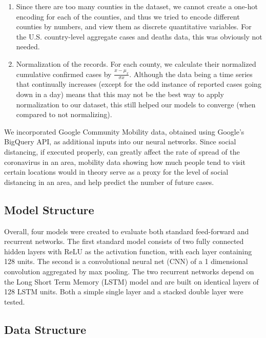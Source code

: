 ﻿\documentclass{article}
\begin{document}
\begin{multicols}{2}
\begin{enumerate}
  
    \item Since there are too many counties in the dataset, we cannot create a
      one-hot encoding for each of the counties, and thus we tried to encode
      different counties by numbers, and view them as discrete quantitative variables.
      For the U.S. country-level aggregate cases and deaths data, this was obviously
      not needed.

      \item Normalization of the records. For each county, we calculate their
        normalized cumulative confirmed cases by $\frac{x-\mu_{x}}{\sigma{x}}$. Although
        the data being a time series that continually increases (except for the odd
        instance of reported cases going down in a day) means that this may not be the
        best way to apply normalization to our dataset, this still helped our models to
        converge (when compared to not normalizing).

\end{enumerate}

We incorporated Google Community Mobility data, obtained using
Google’s BigQuery API, as additional inputs into our neural networks. Since
social distancing, if executed properly, can greatly affect the rate of spread
of the coronavirus in an area, mobility data showing how much people tend to
visit certain locations would in theory serve as a proxy for the level of social
distancing in an area, and help predict the number of future cases. 

\subsection*{Model Structure}

Overall, four models were created to evaluate both standard feed-forward
and recurrent networks.
The first standard model consists of two fully connected hidden layers with ReLU
as the activation function, with each layer containing 128 units.
The second is a convolutional neural net (CNN) of a 1 dimensional convolution
aggregated by max pooling.
The two recurrent networks depend on the Long Short Term Memory (LSTM) model and
are built on identical layers of 128 LSTM units.
Both a simple single layer and a stacked double layer were tested.

\subsection*{Data Structure}


\end{multicols}
\end{document}
